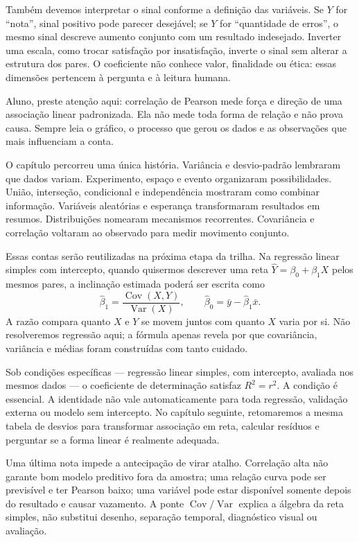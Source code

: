 Também devemos interpretar o sinal conforme a definição das variáveis. Se $Y$ for ``nota'', sinal positivo pode parecer desejável; se $Y$ for ``quantidade de erros'', o mesmo sinal descreve aumento conjunto com um resultado indesejado. Inverter uma escala, como trocar satisfação por insatisfação, inverte o sinal sem alterar a estrutura dos pares. O coeficiente não conhece valor, finalidade ou ética: essas dimensões pertencem à pergunta e à leitura humana.

\begin{GuidedBox}
Aluno, preste atenção aqui: correlação de Pearson mede força e direção de uma associação linear padronizada. Ela não mede toda forma de relação e não prova causa. Sempre leia o gráfico, o processo que gerou os dados e as observações que mais influenciam a conta.
\end{GuidedBox}

O capítulo percorreu uma única história. Variância e desvio-padrão lembraram que dados variam. Experimento, espaço e evento organizaram possibilidades. União, interseção, condicional e independência mostraram como combinar informação. Variáveis aleatórias e esperança transformaram resultados em resumos. Distribuições nomearam mecanismos recorrentes. Covariância e correlação voltaram ao observado para medir movimento conjunto.

Essas contas serão reutilizadas na próxima etapa da trilha. Na regressão linear simples com intercepto, quando quisermos descrever uma reta $\widehat{Y}=\beta_0+\beta_1X$ pelos mesmos pares, a inclinação estimada poderá ser escrita como
\[
\widehat{\beta}_1=\frac{\operatorname{Cov}(X,Y)}{\operatorname{Var}(X)},
\qquad
\widehat{\beta}_0=\bar{y}-\widehat{\beta}_1\bar{x}.
\]
A razão compara quanto $X$ e $Y$ se movem juntos com quanto $X$ varia por si. Não resolveremos regressão aqui; a fórmula apenas revela por que covariância, variância e médias foram construídas com tanto cuidado.

Sob condições específicas --- regressão linear simples, com intercepto, avaliada nos mesmos dados --- o coeficiente de determinação satisfaz $R^2=r^2$. A condição é essencial. A identidade não vale automaticamente para toda regressão, validação externa ou modelo sem intercepto. No capítulo seguinte, retomaremos a mesma tabela de desvios para transformar associação em reta, calcular resíduos e perguntar se a forma linear é realmente adequada.

Uma última nota impede a antecipação de virar atalho. Correlação alta não garante bom modelo preditivo fora da amostra; uma relação curva pode ser previsível e ter Pearson baixo; uma variável pode estar disponível somente depois do resultado e causar vazamento. A ponte $\operatorname{Cov}/\operatorname{Var}$ explica a álgebra da reta simples, não substitui desenho, separação temporal, diagnóstico visual ou avaliação.

